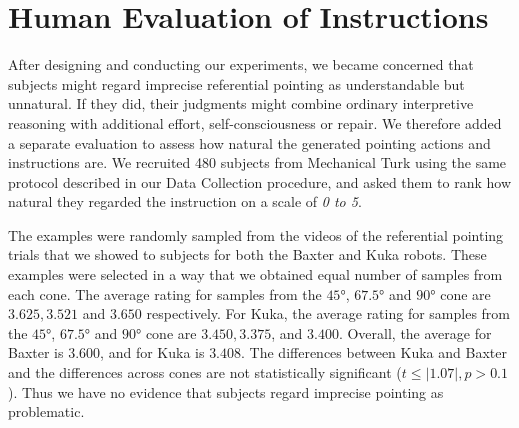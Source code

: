 \section{Human Evaluation of Instructions}

After designing and conducting our experiments, we became concerned that subjects might regard imprecise referential pointing as understandable but unnatural.  If they did, their judgments might combine ordinary interpretive reasoning with additional effort, self-consciousness or repair.  We therefore added a separate evaluation to assess how natural the generated pointing actions and instructions are. We recruited 480 subjects from Mechanical Turk using the same protocol described in our Data Collection procedure, and asked them to rank how natural they regarded the instruction on a scale of \textit{0 to 5}. 

The examples were randomly sampled from the videos of the referential pointing trials that we showed to subjects for both the Baxter and Kuka robots. These examples were selected in a way that we obtained equal number of samples from each cone. The average rating for samples from the $\ang{45}$, $\ang{67.5}$ and $\ang{90}$ cone are $3.625, 3.521$
and $3.650$ respectively. For Kuka, the average rating for samples from the $\ang{45}$, $\ang{67.5}$ and $\ang{90}$ cone are $3.450, 3.375$, and $3.400$. Overall, the average for Baxter is $3.600$, and for Kuka is $3.408$. The differences between Kuka and Baxter and the differences across cones are not statistically significant ($t \leq |1.07|, p > 0.1 $).  Thus we have no evidence that subjects regard imprecise pointing as problematic.
